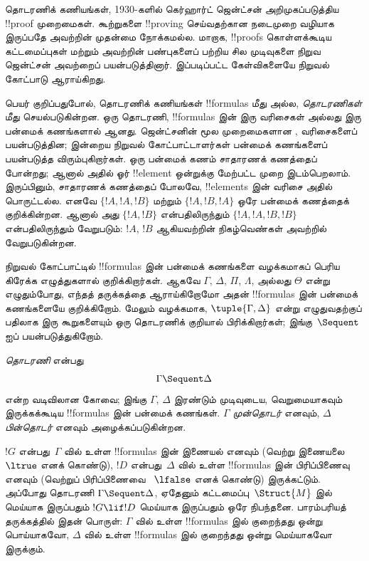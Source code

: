 \documentclass[../../../include/open-logic-section]{subfiles}
\begin{document}


தொடரணிக் கணியங்கள், 1930-களில்
கெர்ஹார்ட் ஜென்ட்சன் அறிமுகப்படுத்திய
!!{proof} முறைமைகள். கூற்றுகளை
!!{proving} செய்வதற்கான
நடைமுறை வழியாக இருப்பதே
அவற்றின் முதன்மை நோக்கமல்ல.
மாறாக, !!{proof}s கொள்ளக்கூடிய
கட்டமைப்புகள் மற்றும் அவற்றின்
பண்புகளைப் பற்றிய சில முடிவுகளை
நிறுவ ஜென்ட்சன் அவற்றைப்
பயன்படுத்தினார். இப்படிப்பட்ட
கேள்விகளையே நிறுவல் கோட்பாடு
ஆராய்கிறது.

பெயர் குறிப்பதுபோல்,
தொடரணிக் கணியங்கள்
!!{formula}s மீது அல்ல,
\emph{தொடரணிகள்} மீது
செயல்படுகின்றன. ஒரு தொடரணி,
!!{formula}s இன்
இரு வரிசைகள் அல்லது
இரு பன்மைக் கணங்களால்
ஆனது. ஜென்ட்சனின்
மூல முறைமைகளான
, 
வரிசைகளைப் பயன்படுத்தின;
இன்றைய நிறுவல்
கோட்பாட்டாளர்கள்
பன்மைக் கணங்களைப்
பயன்படுத்த விரும்புகிறார்கள்.
ஒரு பன்மைக் கணம்
சாதாரணக் கணத்தைப் போன்றது;
ஆனால் அதில் ஓர்
!!{element} ஒன்றுக்கு
மேற்பட்ட முறை
இடம்பெறலாம். இருப்பினும்,
சாதாரணக் கணத்தைப் போலவே,
!!{element}s இன்
வரிசை அதில் பொருட்டல்ல.
எனவே $\{!A, !A, !B\}$
மற்றும் $\{!A, !B, !A\}$
ஒரே பன்மைக் கணத்தைக்
குறிக்கின்றன. ஆனால்
அது $\{!A, !B\}$
என்பதிலிருந்தும்
$\{!A, !A, !B, !B\}$
என்பதிலிருந்தும் வேறுபடும்:
$!A$, $!B$ ஆகியவற்றின்
நிகழ்வெண்கள் அவற்றில்
வேறுபடுகின்றன.

நிறுவல் கோட்பாட்டில்
!!{formula}s இன்
பன்மைக் கணங்களை
வழக்கமாகப் பெரிய
கிரேக்க எழுத்துகளால்
குறிக்கிறார்கள். ஆகவே
$\Gamma$, $\Delta$,
$\Pi$, $\Lambda$,
அல்லது $\Theta$
என்று எழுதும்போது,
எந்தத் தருக்கத்தை
ஆராய்கிறோமோ அதன்
!!{formula}s இன்
பன்மைக் கணங்களையே
குறிக்கிறோம். மேலும்
வழக்கமாக,
$\tuple{\Gamma, \Delta}$
என்று எழுதுவதற்குப்
பதிலாக இரு கூறுகளையும்
ஒரு தொடரணிக்
குறியால் பிரிக்கிறார்கள்;
இங்கு~$\Sequent$
ஐப் பயன்படுத்துகிறோம்.

\begin{defn}[தொடரணி]
\emph{தொடரணி} என்பது
\[
\Gamma \Sequent \Delta
\]
என்ற வடிவிலான கோவை;
இங்கு $\Gamma$, $\Delta$
இரண்டும் முடிவுடைய,
வெறுமையாகவும் இருக்கக்கூடிய
!!{formula}s இன்
பன்மைக் கணங்கள்.
$\Gamma$ \emph{முன்தொடர்}
எனவும், $\Delta$
\emph{பின்தொடர்} எனவும்
அழைக்கப்படுகின்றன.
\end{defn}

$!G$ என்பது~$\Gamma$ வில்
உள்ள !!{formula}s இன்
இணையல் எனவும்
(வெற்று இணையலை~$\ltrue$
எனக் கொண்டு),
$!D$ என்பது~$\Delta$
வில் உள்ள !!{formula}s
இன் பிரிப்பிணைவு எனவும்
(வெற்றுப் பிரிப்பிணைவை
~$\lfalse$ எனக் கொண்டு)
இருக்கட்டும். அப்போது
தொடரணி $\Gamma \Sequent
\Delta$, ஏதேனும்
கட்டமைப்பு~$\Struct{M}$
இல் மெய்யாக இருப்பதும்
$!G \lif !D$
மெய்யாக இருப்பதும்
ஒரே நிபந்தனை.
பாரம்பரியத் தருக்கத்தில்
இதன் பொருள்:
$\Gamma$ வில் உள்ள
!!{formula}s இல்
குறைந்தது ஒன்று
பொய்யாகவோ,
$\Delta$ வில் உள்ள
!!{formula}s இல்
குறைந்தது ஒன்று
மெய்யாகவோ இருக்கும்.
\end{document}
